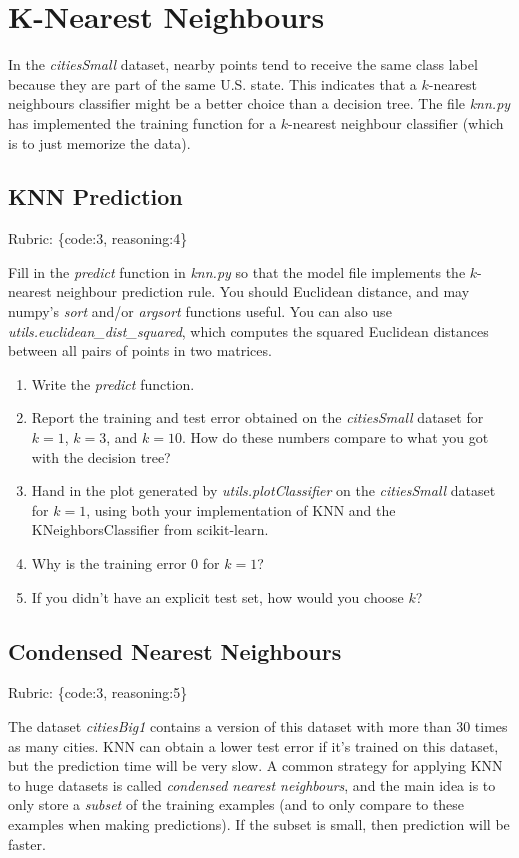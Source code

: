 \documentclass{article}
\def\blu#1{{\color{blu}#1}}
\def\gre#1{{\color{gre}#1}}
\def\enum#1{\begin{enumerate}#1\end{enumerate}}
\def\rubric#1{\gre{Rubric: \{#1\}}}{}
\begin{document}
\section{K-Nearest Neighbours}

In the \emph{citiesSmall} dataset, nearby points tend to receive the same class label because they are part of the same U.S. state. This indicates that a $k$-nearest neighbours classifier might be a better choice than a decision tree. The file \emph{knn.py} has implemented the training function for a $k$-nearest neighbour classifier (which is to just memorize the data).


\subsection{KNN Prediction}
\rubric{code:3, reasoning:4}

Fill in the \emph{predict} function in \emph{knn.py} so that the model file implements the $k$-nearest neighbour prediction rule.
You should Euclidean distance, and may numpy's \emph{sort} and/or \emph{argsort} functions useful.
You can also use \emph{utils.euclidean\_dist\_squared}, which computes the squared Euclidean distances between all pairs of points in two matrices.
\blu{
\enum{
\item Write the \emph{predict} function.
\item Report  the training and test error obtained on the \emph{citiesSmall} dataset for $k=1$, $k=3$, and $k=10$. How do these numbers compare to what you got with the decision tree?
\item Hand in the plot generated by \emph{utils.plotClassifier} on the \emph{citiesSmall} dataset for $k=1$, using both your implementation of KNN and the KNeighborsClassifier from scikit-learn.
\item Why is the training error $0$ for $k=1$?
\item If you didn't have an explicit test set, how would you choose $k$?
}}

\subsection{Condensed Nearest Neighbours}
\rubric{code:3, reasoning:5}

The dataset \emph{citiesBig1} contains a version of this dataset with more than 30 times as many cities. KNN can obtain a lower test error if it's trained on this dataset, but the prediction time will be very slow.
A common strategy for applying KNN to huge datasets is called \emph{condensed nearest neighbours}, and the main idea is to only store a \emph{subset}
of the training examples (and to only compare to these examples when making predictions). If the subset is small, then prediction will be faster.
\end{document}
